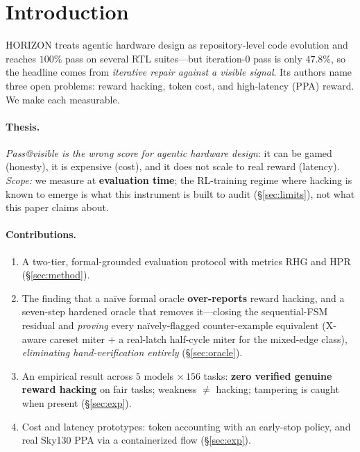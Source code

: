 \documentclass[10pt]{article}
\newcommand{\rhg}{\textsf{RHG}}
\newcommand{\hpr}{\textsf{HPR}}
\begin{document}
\section{Introduction}
HORIZON treats agentic hardware design as repository-level code evolution and reaches $100\%$ pass
on several RTL suites---but iteration-0 pass is only $47.8\%$, so the headline comes from
\emph{iterative repair against a visible signal}. Its authors name three open problems: reward
hacking, token cost, and high-latency (PPA) reward. We make each measurable.

\paragraph{Thesis.} \emph{Pass@visible is the wrong score for agentic hardware design}: it can be
gamed (honesty), it is expensive (cost), and it does not scale to real reward (latency).
\emph{Scope:} we measure at \textbf{evaluation time}; the RL-training regime where hacking is known to
emerge is what this instrument is built to audit (\S\ref{sec:limits}), not what this paper claims about.

\paragraph{Contributions.}
\begin{enumerate}[leftmargin=*,topsep=2pt,itemsep=1pt]
\item A two-tier, formal-grounded evaluation protocol with metrics \rhg{} and \hpr{} (\S\ref{sec:method}).
\item The finding that a na\"ive formal oracle \textbf{over-reports} reward hacking, and a
seven-step hardened oracle that removes it---closing the sequential-FSM residual and \emph{proving}
every na\"ively-flagged counter-example equivalent (X-aware careset miter $+$ a real-latch half-cycle
miter for the mixed-edge class), \emph{eliminating hand-verification entirely} (\S\ref{sec:oracle}).
\item An empirical result across $5$ models $\times\,156$ tasks: \textbf{zero verified genuine
reward hacking} on fair tasks; weakness $\ne$ hacking; tampering is caught when present
(\S\ref{sec:exp}).
\item Cost and latency prototypes: token accounting with an early-stop policy, and real Sky130 PPA
via a containerized flow (\S\ref{sec:exp}).
\end{enumerate}
\end{document}
